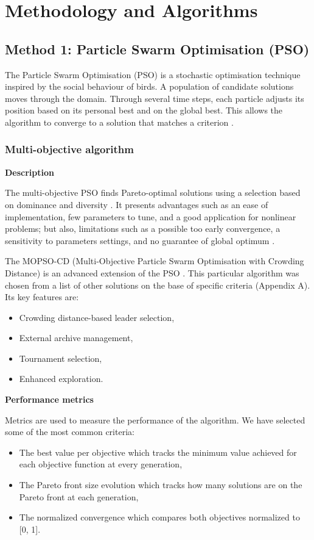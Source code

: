 \section{Methodology and Algorithms}

\subsection{Method 1: Particle Swarm Optimisation (PSO)}

The Particle Swarm Optimisation (PSO) is a stochastic optimisation technique inspired by the social behaviour of birds. A population of candidate solutions moves through the domain. Through several time steps, each particle adjusts its position based on its personal best and on the global best. This allows the algorithm to converge to a solution that matches a criterion \cite{riaz_lec2}.

\subsubsection{Multi-objective algorithm}

\textbf{Description}

The multi-objective PSO finds Pareto-optimal solutions using a selection based on dominance and diversity \cite{riaz_lec3}. It presents advantages such as an ease of implementation, few parameters to tune, and a good application for nonlinear problems; but also, limitations such as a possible too early convergence, a sensitivity to parameters settings, and no guarantee of global optimum \cite{riaz_lec2}.

The MOPSO-CD (Multi-Objective Particle Swarm Optimisation with Crowding Distance) is an advanced extension of the PSO \cite{blank_mopso}. This particular algorithm was chosen from a list of other solutions on the base of specific criteria (Appendix A). Its key features are:
\begin{itemize}
    \item Crowding distance-based leader selection,
    \item External archive management,
    \item Tournament selection,
    \item Enhanced exploration.
\end{itemize}

\textbf{Performance metrics}

Metrics are used to measure the performance of the algorithm. We have selected some of the most common criteria:
\begin{itemize}
    \item The best value per objective which tracks the minimum value achieved for each objective function at every generation,
    \item The Pareto front size evolution which tracks how many solutions are on the Pareto front at each generation,
    \item The normalized convergence which compares both objectives normalized to [0, 1].
\end{itemize}

